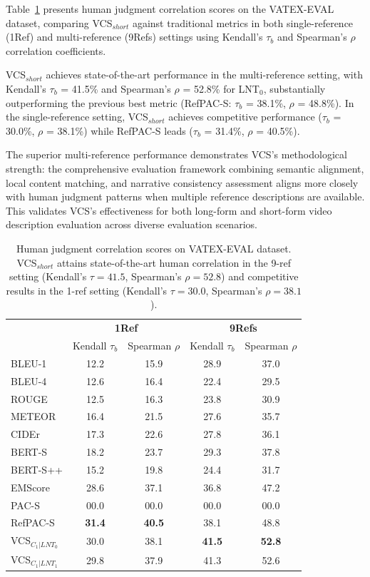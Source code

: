 \documentclass[main.tex]{subfiles}
\begin{document}
Table~\ref{tab:vatex-eval} presents human judgment correlation scores on the VATEX-EVAL dataset, comparing VCS$_{short}$ against traditional metrics in both single-reference (1Ref) and multi-reference (9Refs) settings using Kendall's $\tau_b$ and Spearman's $\rho$ correlation coefficients.

VCS$_{short}$ achieves state-of-the-art performance in the multi-reference setting, with Kendall's $\tau_b$ = 41.5\% and Spearman's $\rho$ = 52.8\% for LNT$_0$, substantially outperforming the previous best metric (RefPAC-S: $\tau_b$ = 38.1\%, $\rho$ = 48.8\%). In the single-reference setting, VCS$_{short}$ achieves competitive performance ($\tau_b$ = 30.0\%, $\rho$ = 38.1\%) while RefPAC-S leads ($\tau_b$ = 31.4\%, $\rho$ = 40.5\%).

The superior multi-reference performance demonstrates VCS's methodological strength: the comprehensive evaluation framework combining semantic alignment, local content matching, and narrative consistency assessment aligns more closely with human judgment patterns when multiple reference descriptions are available. This validates VCS's effectiveness for both long-form and short-form video description evaluation across diverse evaluation scenarios.

\begin{table}[t]
  \centering
  \normalsize
  \setlength{\tabcolsep}{0.75mm}
  \begin{tabular}{l@{\hspace{0.1mm}}cccc}
    \hline
    & \multicolumn{2}{c}{\textbf{1Ref}} & \multicolumn{2}{c}{\textbf{9Refs}} \\
    \cline{2-3} \cline{4-5}
    & Kendall $\tau_b$ & Spearman $\rho$ & Kendall $\tau_b$ & Spearman $\rho$ \\
    \hline
    BLEU-1 & 12.2 & 15.9 & 28.9 & 37.0 \\
    BLEU-4 & 12.6 & 16.4 & 22.4 & 29.5 \\
    ROUGE & 12.5 & 16.3 & 23.8 & 30.9 \\
    METEOR & 16.4 & 21.5 & 27.6 & 35.7 \\
    CIDEr & 17.3 & 22.6 & 27.8 & 36.1 \\
    \hline
    BERT-S & 18.2 & 23.7 & 29.3 & 37.8 \\
    BERT-S++ & 15.2 & 19.8 & 24.4 & 31.7 \\
    \hline
    EMScore & 28.6 & 37.1 & 36.8 & 47.2 \\
    PAC-S & 00.0 & 00.0 & 00.0 & 00.0 \\
    RefPAC-S & \textbf{31.4} & \textbf{40.5} & 38.1 & 48.8 \\
    \hline
    VCS$_{C_1|LNT_0}$ & 30.0 & 38.1 & \textbf{41.5} & \textbf{52.8} \\
    VCS$_{C_1|LNT_1}$ & 29.8 & 37.9 & 41.3 & 52.6 \\
    \hline
  \end{tabular}
  \caption{Human judgment correlation scores on VATEX-EVAL dataset. VCS$_{short}$ attains state-of-the-art human correlation in the 9-ref setting (Kendall's $\tau = 41.5$, Spearman's $\rho = 52.8$) and competitive results in the 1-ref setting (Kendall's $\tau = 30.0$, Spearman's $\rho = 38.1$).}
  \label{tab:vatex-eval}
\end{table}
\end{document}
